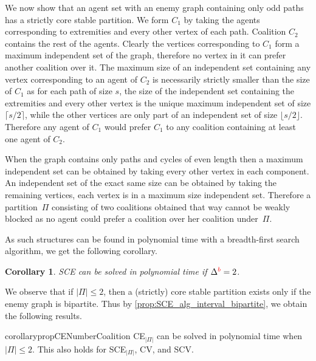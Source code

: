 \documentclass[a4paper,fleqn]{cas-sc}
\newcommand{\enemyColor}{red}
\newcommand{\agent}{agent\xspace}
\newcommand{\agents}{agents\xspace}
\newcommand{\partition}{\ensuremath{\Pi}\xspace}
\newcommand{\coalition}{\ensuremath{C}\xspace}
\newcommand{\enemySuperscript}{{\color{\enemyColor}b}}
\newcommand{\SCE}{SCE\xspace}
\newcommand{\CEBounded}{CE$_{\maxNumberOfCoalitions}$\xspace}
\newcommand{\SCEBounded}{SCE$_{\maxNumberOfCoalitions}$\xspace}
\newcommand{\SCV}{SCV\xspace}
\newcommand{\CV}{CV\xspace}
\newcommand{\maxDegree}{\ensuremath{\Delta}}
\newcommand{\maxDegreeEnemy}{\ensuremath{\maxDegree^{\enemySuperscript}}\xspace}
\newcommand{\maxNumberOfCoalitions}{\ensuremath{|\partition|}\xspace}
\newtheorem{corollary}{Corollary}
\newcommand{\appsymb}{$\star$}
\begin{document}
{   We now show that an \agent set with an enemy graph containing only odd paths has a strictly core stable partition. We form $\coalition_1$ by taking the \agents corresponding to extremities and every other vertex of each path. Coalition $\coalition_2$ contains the rest of the \agents. Clearly the vertices corresponding to $\coalition_1$ form a maximum independent set of the graph, therefore no vertex in it can prefer another coalition over it. The maximum size of an independent set containing any vertex corresponding to an \agent of $\coalition_2$ is necessarily strictly smaller than the size of $\coalition_1$ as for each path of size $s$, the size of the independent set containing the extremities and every other vertex is the unique maximum independent set of size $\lceil s/2 \rceil$, while the other vertices are only part of an independent set of size $\lfloor s/2 \rfloor$. Therefore any \agent of $\coalition_1$ would prefer $\coalition_1$ to any coalition containing at least one \agent of $\coalition_2$.
   
   When the graph contains only paths and cycles of even length then a maximum independent set can be obtained by taking every other vertex in each component. An independent set of the exact same size can be obtained by taking the remaining vertices, each vertex is in a maximum size independent set. Therefore a partition~\partition consisting of two coalitions obtained that way cannot be weakly blocked as no \agent could prefer a coalition over her coalition under~\partition.
}

As such structures can be found in polynomial time with a breadth-first search algorithm, we get the following corollary.


\begin{corollary}
    \SCE can be solved in polynomial time if $\maxDegreeEnemy=2$.
    \label{cor:SCE_DegreeEnemy_2}
\end{corollary}








We observe  that if $\maxNumberOfCoalitions \leq 2$, then a (strictly) core stable partition exists only if the enemy graph is bipartite. Thus by \cref{prop:SCE_alg_interval_bipartite}, we obtain the following results. 

\begin{restatable}[\appsymb]{corollary}{propCENumberCoalition}
    \CEBounded can be solved in polynomial time when $\maxNumberOfCoalitions \leq 2$. This also holds for \SCEBounded, \CV, and \SCV.
    \label{prop:CE_Number_Coalitions_2}
\end{restatable}
\end{document}

